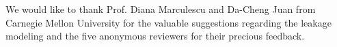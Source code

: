 We would like to thank Prof. Diana Marculescu and Da-Cheng Juan from Carnegie Mellon University for the valuable suggestions regarding the leakage modeling and the five anonymous reviewers for their precious feedback.
